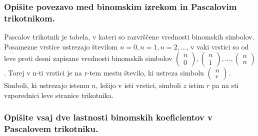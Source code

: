 \documentclass{article}
\begin{document}
\subsubsection*{Opišite povezavo med binomskim izrekom in Pascalovim trikotnikom.}

Pascalov trikotnik je tabela, v kateri so razvrščene vrednosti binomskih simbolov. Posamezne vrstice ustrezajo številom $n=0, n=1, n=2, \ldots$, v vaki vrstici so od leve proti desni zapisane vrednosti binomskih simbolov $\left(\begin{array}{l}n \\ 0\end{array}\right),\left(\begin{array}{l}n \\ 1\end{array}\right), \ldots,\left(\begin{array}{l}n \\ n\end{array}\right)$. Torej v n-ti vrstici je na r-tem mestu število, ki ustreza simbolu $\left(\begin{array}{l}n \\ r\end{array}\right)$. Simboli, ki ustrezajo istemu $n$, ležijo v isti vrstici, simboli $z$ istim $r$ pa na sti vzporednici leve stranice trikotnika.

\subsubsection*{Opišite vsaj dve lastnosti binomskih koeficientov v Pascalovem trikotniku.}
\end{document}
